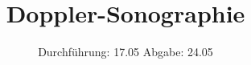

\subject{US3}
\title{Doppler-Sonographie}
\date{
  Durchführung: 17.05
  \hspace{3em}
  Abgabe: 24.05
}



\maketitle
\thispagestyle{empty}
\tableofcontents
\newpage








\newpage
\printbibliography{}
\nocite{matplotlib}
\nocite{numpy}
\nocite{scipy}
\nocite{uncertainties}
\nocite{reback2020pandas}

% 


